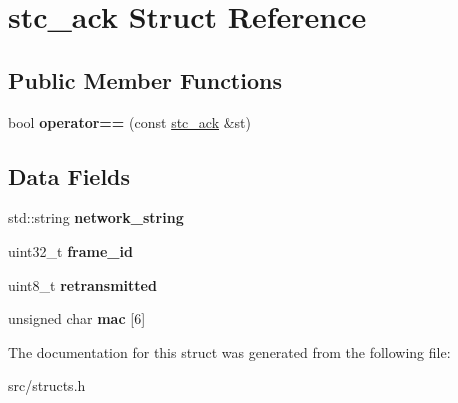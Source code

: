 \hypertarget{structstc__ack}{\section{stc\-\_\-ack Struct Reference}
\label{structstc__ack}
}
\subsection*{Public Member Functions}
\begin{DoxyCompactItemize}
\item 
\hypertarget{structstc__ack_a990edbb8d4cf9f9ac729ddc8cf6cb71d}{bool {\bfseries operator==} (const \hyperlink{structstc__ack}{stc\-\_\-ack} \&st)}\label{structstc__ack_a990edbb8d4cf9f9ac729ddc8cf6cb71d}

\end{DoxyCompactItemize}
\subsection*{Data Fields}
\begin{DoxyCompactItemize}
\item 
\hypertarget{structstc__ack_aa3ef3373865a4937672e1e221d72cf9c}{std\-::string {\bfseries network\-\_\-string}}\label{structstc__ack_aa3ef3373865a4937672e1e221d72cf9c}

\item 
\hypertarget{structstc__ack_a14df6fc61b91a0161fd0573bfa6f210d}{uint32\-\_\-t {\bfseries frame\-\_\-id}}\label{structstc__ack_a14df6fc61b91a0161fd0573bfa6f210d}

\item 
\hypertarget{structstc__ack_aaeadf5c169f34b762e5f64dc22872cac}{uint8\-\_\-t {\bfseries retransmitted}}\label{structstc__ack_aaeadf5c169f34b762e5f64dc22872cac}

\item 
\hypertarget{structstc__ack_a42b6c5b7677399ac1d4293ac7fc13b96}{unsigned char {\bfseries mac} \mbox{[}6\mbox{]}}\label{structstc__ack_a42b6c5b7677399ac1d4293ac7fc13b96}

\end{DoxyCompactItemize}


The documentation for this struct was generated from the following file\-:\begin{DoxyCompactItemize}
\item 
src/structs.\-h\end{DoxyCompactItemize}
